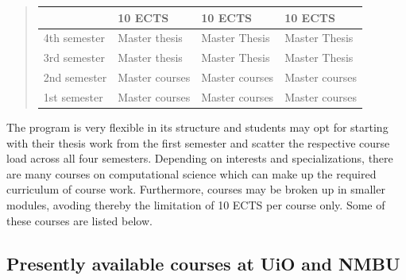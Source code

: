 \documentclass[%
oneside,                 %
final,                   %
10pt]{article}
\begin{document}
\begin{quote}
\begin{tabular}{llll}
\hline
\multicolumn{1}{l}{  } & \multicolumn{1}{l}{ 10 ECTS } & \multicolumn{1}{l}{ 10 ECTS } & \multicolumn{1}{l}{ 10 ECTS } \\
\hline
4th semester & Master thesis  & Master Thesis  & Master Thesis  \\
\hline
3rd semester & Master thesis  & Master Thesis  & Master Thesis  \\
\hline
2nd semester & Master courses & Master courses & Master courses \\
\hline
1st semester & Master courses & Master courses & Master courses \\
\hline
\end{tabular}
\end{quote}

\noindent
The program is very flexible in its structure and students may opt for starting with their thesis
work from the first semester and scatter the respective course load across all four semesters.
Depending on interests and specializations, there are many courses on computational science which can make
up the required curriculum of course work. Furthermore, courses may be broken up in smaller modules,
avoding thereby the limitation of 10 ECTS per course only. Some of these courses are listed below.



\subsection*{Presently available courses at UiO and NMBU}

\paragraph{}
\end{document}
